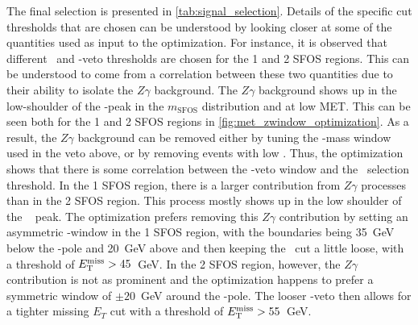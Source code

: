 The final selection is presented in \tab\ref{tab:signal_selection}.
Details of the specific cut thresholds that are chosen can be understood
by looking closer at some of the quantities used as input to 
the optimization. For instance, it is observed that
different \MET~and \z-veto thresholds are chosen for the 1 and 2 SFOS
regions. This can be understood to come from a correlation between
these two quantities due to their ability to isolate the $Z\gamma$
background.
The $Z\gamma$ background shows up in the low-shoulder of the \z-peak
in the $m_{\textrm{SFOS}}$ distribution and at low MET. This can be
seen both for the 1 and 2 SFOS regions in \fig\ref{fig:met_zwindow_optimization}.
As a result, the $Z\gamma$ background can be removed either by tuning 
the \z-mass window used in the veto above, or by removing events with low \met.
Thus, the optimization shows that there is some correlation 
between the \z-veto window and the \met~selection threshold. 
In the 1 SFOS region, there is a larger 
contribution from $Z\gamma$ processes than in the 2 SFOS
region.  This process mostly shows up in the low shoulder 
of the \z~ peak. The optimization
prefers removing this $Z\gamma$ contribution by setting an 
asymmetric \z-window in the 1 SFOS
region, with the boundaries being 35~GeV below the \z-pole 
and 20~GeV above and then keeping the \MET~cut a little loose, with a 
threshold of $E_{\mathrm{T}}^{\mathrm{miss}} > 45$~GeV.  In the 2 SFOS region, however,
the $Z\gamma$ contribution is not as prominent and the 
optimization happens to prefer a symmetric
window of $\pm20$~GeV around the \z-pole.  
The looser \z-veto then allows for a tighter
missing $E_{T}$ cut with a threshold of $E_{\mathrm{T}}^{\mathrm{miss}} > 55$~GeV. 


